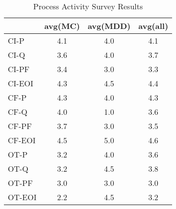 \documentclass[final_report_innit.tex]{subfiles}
\begin{document}
\begin{table}[h]
\caption{Process Activity Survey Results}
\centering
\begin{tabular}{@{}l|c|c|c|@{}}
\cmidrule(l){2-4}
                             & \multicolumn{1}{l|}{avg(MC)} & \multicolumn{1}{l|}{avg(MDD)} & \multicolumn{1}{l|}{avg(all)} \\ \midrule
\multicolumn{1}{|l|}{CI-P}   & 4.1                          & 4.0                           & 4.1                           \\ \midrule
\multicolumn{1}{|l|}{CI-Q}   & 3.6                          & 4.0                           & 3.7                           \\ \midrule
\multicolumn{1}{|l|}{CI-PF}  & 3.4                          & 3.0                           & 3.3                           \\ \midrule
\multicolumn{1}{|l|}{CI-EOI} & 4.3                          & 4.5                           & 4.4                           \\ \midrule
\multicolumn{1}{|l|}{CF-P}   & 4.3                          & 4.0                           & 4.3                           \\ \midrule
\multicolumn{1}{|l|}{CF-Q}   & 4.0                          & 1.0                           & 3.6                           \\ \midrule
\multicolumn{1}{|l|}{CF-PF}  & 3.7                          & 3.0                           & 3.5                           \\ \midrule
\multicolumn{1}{|l|}{CF-EOI} & 4.5                          & 5.0                           & 4.6                           \\ \midrule
\multicolumn{1}{|l|}{OT-P}   & 3.2                          & 4.0                           & 3.6                           \\ \midrule
\multicolumn{1}{|l|}{OT-Q}   & 3.2                          & 4.5                           & 3.8                           \\ \midrule
\multicolumn{1}{|l|}{OT-PF}  & 3.0                          & 3.0                           & 3.0                           \\ \midrule
\multicolumn{1}{|l|}{OT-EOI} & 2.2                          & 4.5                           & 3.2                           \\ \bottomrule
\end{tabular}
\end{table}
\end{document}
